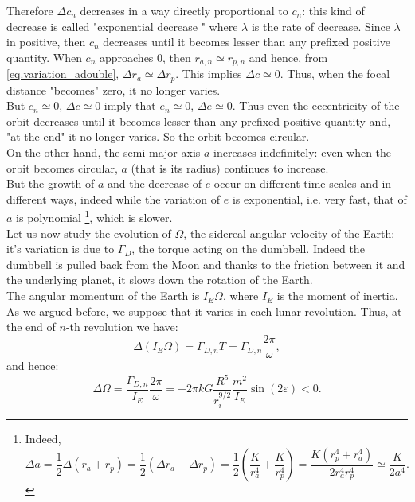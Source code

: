 \documentclass[11pt, oneside,reqno]{amsart}
\begin{document}
Therefore $\Delta c_n$ decreases in a way directly proportional to $c_n$: this kind of decrease is called "exponential decrease
" where $\lambda$ is the rate of decrease. Since $\lambda$ in positive, then $c_n$ decreases until it becomes lesser than any prefixed positive quantity. When $c_n$ approaches $0$, then $r_{a,n} \simeq r_{p,n}$ and hence, from \eqref{eq.variation_adouble}, $\Delta r_a \simeq \Delta r_p$. This implies $\Delta c \simeq 0$. Thus, when the focal distance "becomes" zero, it no longer varies.\\
But $c_n \simeq 0$, $\Delta c \simeq 0$ imply that $e_n \simeq 0$, $\Delta e \simeq 0$. Thus even the eccentricity of the orbit decreases until it becomes lesser than any prefixed positive quantity and, "at the end" it no longer varies. So the orbit becomes circular.\\
On the other hand, the semi-major axis $a$ increases indefinitely: even when the orbit becomes circular, $a$ (that is its radius) continues to increase.\\
But the growth of $a$ and the decrease of $e$ occur on different time scales and in different ways, indeed while the variation of $e$ is exponential, i.e. very fast, that of $a$ is polynomial
\footnote
{
Indeed,
\begin{equation*}
    \Delta a = \frac{1}{2} \Delta (r_a + r_p) = \frac{1}{2} ( \Delta r_a + \Delta r_p ) = \frac{1}{2} \left( \frac{K}{r_a^4} + \frac{K}{r_p^4} \right) = \frac{K (r_p^4 + r_a^4)}{2r_a^4r_p^4} \simeq \frac{K}{2a^4}.
\end{equation*}
},
which is slower.\\
Let us now study the evolution of $\Omega$, the sidereal angular velocity of the Earth: it's variation is due to $\Gamma_D$, the torque acting on the dumbbell. Indeed the dumbbell is pulled back from the Moon and thanks to the friction between it and the underlying planet, it slows down the rotation of the Earth.\\
The angular momentum of the Earth is $I_E \Omega$, where $I_E$ is the moment of inertia. As we argued before, we suppose that it varies in each lunar revolution. Thus, at the end of $n$-th revolution we have:
\begin{equation}\label{eq.angularspeed1}
    \Delta \left( I_E \Omega \right) = \Gamma_{D,n}  T = \Gamma_{D,n} \frac{2\pi}{\omega},
\end{equation}
and hence:
\begin{equation}\label{eq.angularspeed2}
    \Delta \Omega = \frac{\Gamma_{D,n}}{I_E}\frac{2\pi}{\omega}=-2\pi k G \frac{R^5}{r_i^{9/2}} \frac{m^2}{I_E} \sin(2\varepsilon) < 0.
\end{equation}
\end{document}
